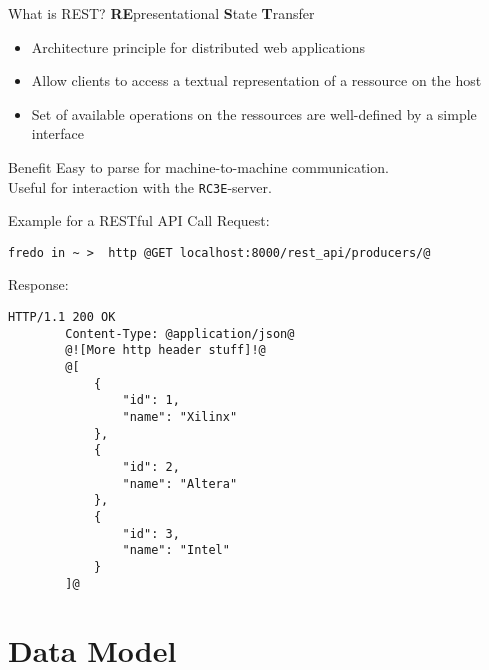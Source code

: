 \documentclass{beamer}
\newcommand{\rccce}{\texttt{RC3E}}
\begin{document}
    \begin{frame}{What is REST?}
        \textbf{RE}presentational \textbf{S}tate \textbf{T}ransfer\\
        \begin{itemize}
            \item Architecture principle for distributed web applications 
            \item Allow clients to access a textual representation of a ressource on the host
            \item Set of available operations on the ressources are well-defined by a simple interface
        \end{itemize}
        
        \begin{exampleblock}{Benefit}
            Easy to parse for machine-to-machine communication. \\
            Useful for interaction with the \rccce -server.
        \end{exampleblock}

    \end{frame}
        
    \begin{frame}[fragile]{Example for a RESTful API Call}
        Request:
        \begin{lstlisting}[style=http]
        fredo in ~ >  http @GET localhost:8000/rest_api/producers/@
        \end{lstlisting}
        
        Response:
        \begin{lstlisting}[style=http]
        HTTP/1.1 200 OK
        Content-Type: @application/json@
        @![More http header stuff]!@
        @[
            {
                "id": 1, 
                "name": "Xilinx"
            }, 
            {
                "id": 2, 
                "name": "Altera"
            }, 
            {
                "id": 3, 
                "name": "Intel"
            }
        ]@
        \end{lstlisting}
    \end{frame}

\section{Data Model}
\end{document}
